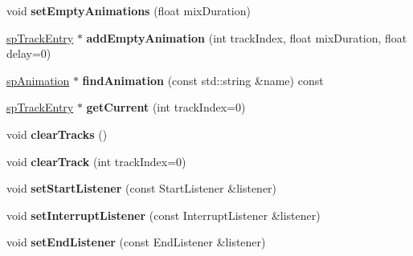 \begin{DoxyCompactItemize}
void {\bfseries set\+Empty\+Animations} (float mix\+Duration)
\item 
\mbox{\label{classspine_1_1SkeletonAnimation_aec65f60b190794daf5533ccd93805e13}} 
\hyperlink{structspTrackEntry}{sp\+Track\+Entry} $\ast$ {\bfseries add\+Empty\+Animation} (int track\+Index, float mix\+Duration, float delay=0)
\item 
\mbox{\label{classspine_1_1SkeletonAnimation_a880854d829bc22a47f293214b9acf2de}} 
\hyperlink{structspAnimation}{sp\+Animation} $\ast$ {\bfseries find\+Animation} (const std\+::string \&name) const
\item 
\mbox{\label{classspine_1_1SkeletonAnimation_af5b32907fff6d460399eb7ced9bb282a}} 
\hyperlink{structspTrackEntry}{sp\+Track\+Entry} $\ast$ {\bfseries get\+Current} (int track\+Index=0)
\item 
\mbox{\label{classspine_1_1SkeletonAnimation_a3495825f32c03295d06f57d1d79b7da0}} 
void {\bfseries clear\+Tracks} ()
\item 
\mbox{\label{classspine_1_1SkeletonAnimation_a984604c1c3f05bef91e2d9694dd306c2}} 
void {\bfseries clear\+Track} (int track\+Index=0)
\item 
\mbox{\label{classspine_1_1SkeletonAnimation_a934470b683acd7cc79e9572d3df5638b}} 
void {\bfseries set\+Start\+Listener} (const Start\+Listener \&listener)
\item 
\mbox{\label{classspine_1_1SkeletonAnimation_a251d7de6717cd00d98e0f2ca34073f8a}} 
void {\bfseries set\+Interrupt\+Listener} (const Interrupt\+Listener \&listener)
\item 
\mbox{\label{classspine_1_1SkeletonAnimation_a200f2b67b1531084eca11abe2afa8d5f}} 
void {\bfseries set\+End\+Listener} (const End\+Listener \&listener)
\item 
\mbox{\label{classspine_1_1SkeletonAnimation_ab001bbb541d3133692cf34c6da967a71}} 

\end{DoxyCompactItemize}
